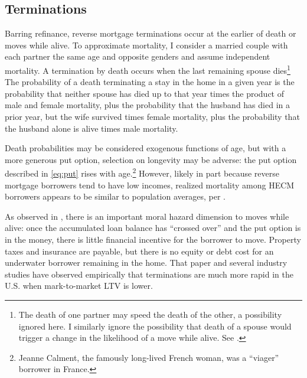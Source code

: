 \documentclass[12pt]{article}
\begin{document}
\subsection{Terminations}

Barring refinance, reverse mortgage terminations occur at the earlier of death
or moves while alive. To approximate mortality, I consider a married couple
with each partner the same age and opposite genders and assume independent
mortality. A termination by death occurs when the last remaining spouse
dies\footnote{The death of one partner may speed the death of the other, a
possibility ignored here. I similarly ignore the possibility that death of a
spouse would trigger a change in the likelihood of a move while alive. See
\textcite{Lin2005}.} The probability of a death terminating a stay in the home
in a given year is the probability that neither spouse has died up to that year
times the product of male and female mortality, plus the probability that the
husband has died in a prior year, but the wife survived times female mortality,
plus the probability that the husband alone is alive times male mortality.

Death probabilities may be considered exogenous functions of age, but with a
more generous put option, selection on longevity may be adverse: the put
option described in \eqref{eq:put} rises with age.\footnote{Jeanne Calment, the
famously long-lived French woman, was a ``viager'' borrower in France.}
However, likely in part because reverse mortgage borrowers tend to have low incomes,
realized mortality among HECM borrowers appears to be similar to population
averages, per \textcite{YangMillerJiang}.

As observed in \textcite{DavidoffWelke}, there is an important moral hazard
dimension to moves while alive: once the accumulated loan balance has ``crossed
over'' and the put option is in the money, there is little financial incentive
for the borrower to move. Property taxes and insurance are payable, but there
is no equity or debt cost for an underwater borrower remaining in the home.
That paper and several industry studies have observed empirically that
terminations are much more rapid in the U.S. when mark-to-market LTV is lower. 
\end{document}
